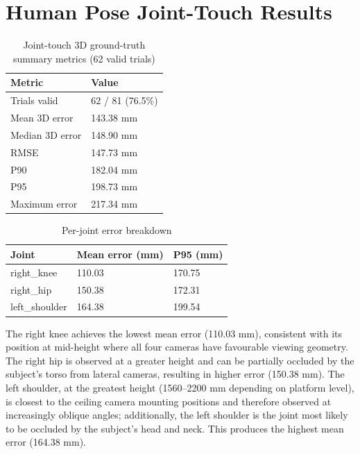 \section{Human Pose Joint-Touch Results}

\begin{table}[htbp]
\centering
\caption{Joint-touch 3D ground-truth summary metrics (62 valid trials)}
\label{tab:5_2}
\begin{tabular}{|l|l|}
\hline
\textbf{Metric} & \textbf{Value} \\
\hline
Trials valid & 62 / 81 (76.5\%) \\
\hline
Mean 3D error & 143.38 mm \\
\hline
Median 3D error & 148.90 mm \\
\hline
RMSE & 147.73 mm \\
\hline
P90 & 182.04 mm \\
\hline
P95 & 198.73 mm \\
\hline
Maximum error & 217.34 mm \\
\hline
\end{tabular}
\end{table}

\begin{table}[htbp]
\centering
\caption{Per-joint error breakdown}
\label{tab:5_3}
\begin{tabular}{|l|l|l|}
\hline
\textbf{Joint} & \textbf{Mean error (mm)} & \textbf{P95 (mm)} \\
\hline
right\_knee & 110.03 & 170.75 \\
\hline
right\_hip & 150.38 & 172.31 \\
\hline
left\_shoulder & 164.38 & 199.54 \\
\hline
\end{tabular}
\end{table}

The right knee achieves the lowest mean error (110.03 mm), consistent with its position at mid-height where all four cameras have favourable viewing geometry. The right hip is observed at a greater height and can be partially occluded by the subject's torso from lateral cameras, resulting in higher error (150.38 mm). The left shoulder, at the greatest height (1560--2200 mm depending on platform level), is closest to the ceiling camera mounting positions and therefore observed at increasingly oblique angles; additionally, the left shoulder is the joint most likely to be occluded by the subject's head and neck. This produces the highest mean error (164.38 mm).

